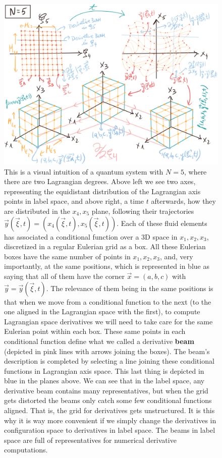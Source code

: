 \documentclass[11pt, a4paper]{article} %
\begin{document}
\begin{figure}[p!]
  \centering
    \includegraphics[width=1\linewidth]{12_N6.png}
  \caption{This is a visual intuition of a quantum system with $N=5$, where there are two Lagrangian degrees. Above left we see two axes, representing the equidistant distribution of the Lagrangian axis points in label space, and above right, a time $t$ afterwards, how they are distributed in the $x_4,x_5$ plane, following their trajectories $\vec{y}(\vec{\xi},t)=(x_4(\vec{\xi},t),x_5(\vec{\xi},t))$. Each of these fluid elements has associated a conditional function over a 3D space in $x_1,x_2,x_3$, discretized in a regular Eulerian grid as a box. All these Eulerian boxes have the same number of points in $x_1,x_2,x_3$, and, very importantly, at the same positions, which is represented in blue as saying that all of them have the corner $\vec{x}=(a,b,c)$ with $\vec{y}=\vec{y}(\vec{\xi},t)$. The relevance of them being in the same positions is that when we move from a conditional function to the next (to the one aligned in the Lagrangian space with the first), to compute Lagrangian space derivatives we will need to take care for the same Eulerian point within each box. These same points in each conditional function define what we called a derivative {\bf beam} (depicted in pink lines with arrows joining the boxes). The beam's description is completed by selecting a line joining these conditional functions in Lagrangian axis space. This last thing is depicted in blue in the planes above. We can see that in the label space, any derivative beam contains many representatives, but when the grid gets distorted the beams only catch some few conditional functions aligned. That is, the grid for derivatives gets unstructured. It is this why it is way more convenient if we simply change the derivatives in configuration space to derivatives in label space. The beams in label space are full of representatives for numerical derivative computations.  }
  \label{fig:hyperplane2}
\end{figure}
\end{document}

